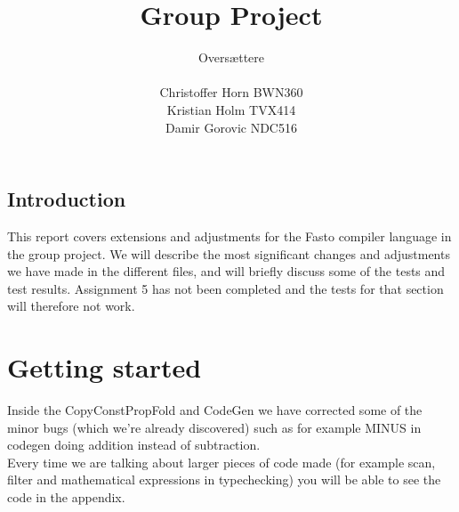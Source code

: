 \documentclass[12pt]{article}
\author{Oversættere\\\\Christoffer Horn BWN360\\Kristian Holm TVX414\\Damir Gorovic NDC516}
\title{Group Project}
\begin{document}
\maketitle
\hfil \break
\hfil \break
\hfil \break
\subsection*{Introduction}
This report covers extensions and adjustments for the Fasto compiler language in the group project. We will describe the most significant changes and adjustments we have made in the different files, and will briefly discuss some of the tests and test results. Assignment 5 has not been completed and the tests for that section will therefore not work.
\pagebreak
\tableofcontents
\pagebreak
\section{Getting started}
Inside the CopyConstPropFold and CodeGen we have corrected some of the minor bugs (which we're already discovered) such as for example MINUS in codegen doing addition instead of subtraction.\\
Every time we are talking about larger pieces of code made (for example scan, filter and mathematical expressions in typechecking) you will be able to see the code in the appendix.
\end{document}
